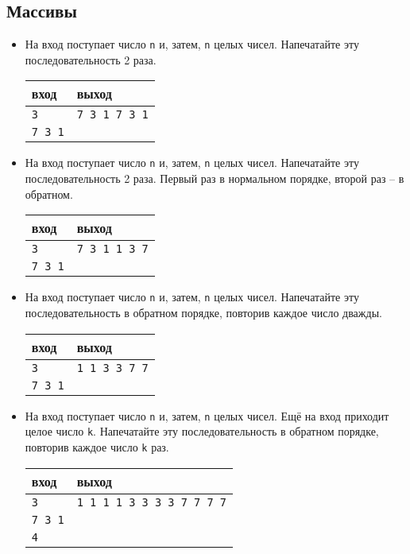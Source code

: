\documentclass{article}
\begin{document}
\subsection*{Массивы}
\begin{itemize}
\item На вход поступает число \texttt{n} и, затем, \texttt{n} целых чисел. Напечатайте эту последовательность 2 раза.
\begin{center}
\begin{tabular}{ l | l }
 вход & выход \\ \hline
 \texttt{3} & \texttt{7 3 1 7 3 1}  \\ 
 \texttt{7 3 1} &  \\ 
\end{tabular}
\end{center}

\item На вход поступает число \texttt{n} и, затем, \texttt{n} целых чисел. Напечатайте эту последовательность 2 раза. Первый раз в нормальном порядке, второй раз -- в обратном.
\begin{center}
\begin{tabular}{ l | l }
 вход & выход \\ \hline
 \texttt{3} & \texttt{7 3 1 1 3 7}  \\ 
 \texttt{7 3 1} &  \\ 
\end{tabular}
\end{center}

\item На вход поступает число \texttt{n} и, затем, \texttt{n} целых чисел. Напечатайте эту последовательность в обратном порядке, повторив каждое число дважды.
\begin{center}
\begin{tabular}{ l | l }
 вход & выход \\ \hline
 \texttt{3} & \texttt{1 1 3 3 7 7}  \\ 
 \texttt{7 3 1} &  \\ 
\end{tabular}
\end{center}


\item На вход поступает число \texttt{n} и, затем, \texttt{n} целых чисел. Ещё на вход приходит целое число \texttt{k}. Напечатайте эту последовательность в обратном порядке, повторив каждое число \texttt{k} раз.
\begin{center}
\begin{tabular}{ l | l }
 вход & выход \\ \hline
 \texttt{3} & \texttt{1 1 1 1 3 3 3 3 7 7 7 7}  \\ 
 \texttt{7 3 1} &  \\ 
 \texttt{4} &  \\
\end{tabular}
\end{center}


\end{itemize}
\end{document}
